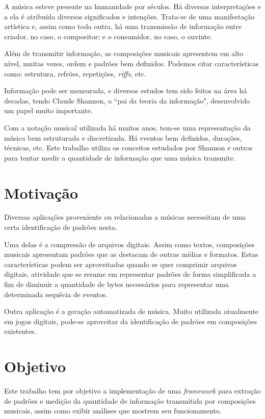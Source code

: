 A música esteve presente na humanidade por séculos. Há diversas interpretações e a ela é atribuída diversos significados e intenções. Trata-se de uma manifestação artística e, assim como toda outra, há uma transmissão de informação entre criador, no caso, o compositor; e o consumidor, no caso, o ouvinte.

Além de transmitir informação, as composições musicais apresentem em alto nível, muitas vezes, ordem e padrões bem definidos. Podemos citar características como: estrutura, refrões, repetições, \textit{riffs}, etc.

Informação pode ser mensurada, e diversos estudos tem sido feitos na área há decadas, tendo Claude Shannon, o ``pai da teoria da informação", desenvolvido um papel muito importante. \cite{shannon}

Com a notação musical utilizada há muitos anos, tem-se uma representação da música bem estruturada e discretizada. Há eventos bem definidos, durações, técnicas, etc. Este trabalho utiliza os conceitos estudados por Shannon e outros para tentar medir a quantidade de informação que uma música transmite.

\section{Motivação}

Diversas aplicações proveniente ou relacionadas a músicas necessitam de uma certa identificação de padrões nesta.

Uma delas é a compressão de arquivos digitais. Assim como textos, composições musicais apresentam padrões que as destacam de outras mídias e formatos. Estas características podem ser aproveitadas quando se quer comprimir arquivos digitais, atividade que se resume em representar padrões de forma simplificada a fim de diminuir a quantidade de bytes necessários para representar uma determinada sequêcia de eventos.

Outra aplicação é a geração automatizada de música. Muito utilizada atualmente em jogos digitais, pode-se aproveitar da identificação de padrões em composições existentes.

\section{Objetivo}

Este trabalho tem por objetivo a implementação de uma \textit{framework} para extração de padrões e medição da quantidade de informação transmitida por composições musicais, assim como exibir análises que mostrem seu funcionamento.

